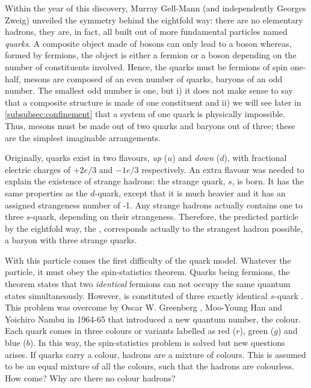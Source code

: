 Within the year of this discovery, Murray Gell-Mann (and independently Georges Zweig) unveiled the symmetry behind the eightfold way: there are no elementary hadrons, they are, in fact, all built out of more fundamental particles named \textit{quarks}. A composite object made of bosons can only lead to a boson whereas, formed by fermions, the object is either a fermion or a boson depending on the number of constituents involved. Hence, the quarks must be fermions of spin one-half, mesons are composed of an even number of quarks, baryons of an odd number. The smallest odd number is one, but i) it does not make sense to say that a composite structure is made of one constituent and ii) we will see later in \Sec\ref{subsubsec:confinement} that a system of one quark is physically impossible. Thus, mesons must be made out of two quarks and baryons out of three; these are the simplest imaginable arrangements. 

Originally, quarks exist in two flavours, \textit{up} ($u$) and \textit{down} ($d$), with fractional electric charges of $+2e/3$ and $-1e/3$ respectively. An extra flavour was needed to explain the existence of strange hadrons: the strange quark, $s$, is born. It has the same properties as the $d$-quark, except that it is much heavier and it has an assigned strangeness number of -1. Any strange hadrons actually contains one to three $s$-quark, depending on their strangeness. Therefore, the predicted particle by the eightfold way, the \rmOmegaM, corresponds actually to the strangest hadron possible, a baryon with three strange quarks. 

With this particle comes the first difficulty of the quark model. Whatever the particle, it must obey the spin-statistics theorem. Quarks being fermions, the theorem states that two \textit{identical} fermions can not occupy the same quantum states simultaneously. However, \rmOmegaM is constituted of three exactly identical $s$-quark \cite{skandsIntroductionQCD2013}. This problem was overcome by Oscar W. Greenberg \cite{greenbergSpinUnitarySpinIndependence1964}, Moo-Young Han and Yoichiro Nambu \cite{hanThreeTripletModelDouble1965} in 1964-65 that introduced a new quantum number, the colour. Each quark comes in three colours or variants labelled as red ($r$), green ($g$) and blue ($b$). In this way, the spin-statistics problem is solved but new questions arises. If quarks carry a colour, hadrons are a mixture of colours. This is assumed to be an equal mixture of all the colours, such that the hadrons are colourless. How come? Why are there no colour hadrons? 

